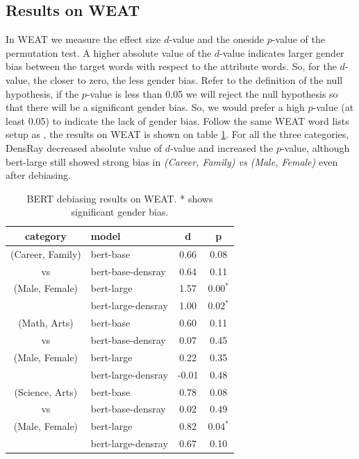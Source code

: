 \subsection{Results on WEAT}
In WEAT we measure the effect size $d$-value and the oneside $p$-value of the permutation test. A higher absolute value of the $d$-value indicates larger gender bias between the target words with respect to the attribute words. So, for the $d$-value, the closer to zero, the less gender bias. Refer to the definition of the null hypothesis, if the $p$-value is less than 0.05 we will reject the null hypothesis so that there will be a significant gender bias. So, we would prefer a high $p$-value (at least 0.05) to indicate the lack of gender bias. Follow the same WEAT word lists setup as \citet{karve2019conceptor}, the results on WEAT is shown on table \ref{t:weat1}. For all the three categories, DensRay decreased absolute value of $d$-value and increased the $p$-value, although bert-large still showed strong bias in \textit{(Career, Family) vs (Male, Female)} even after debiasing.
\begin{table}[ht]
\centering
\footnotesize
\begin{tabular}{clcc}
\hline
category & model & d & p\\
\hline
(Career, Family) & bert-base & 0.66 & 0.08 \\
vs& bert-base-densray & 0.64 & 0.11\\
(Male, Female)& bert-large & 1.57 & $0.00^{*}$ \\
& bert-large-densray & 1.00 & $0.02^{*}$\\
\hline
(Math, Arts) & bert-base & 0.60 & 0.11 \\
vs& bert-base-densray & 0.07 & 0.45\\
(Male, Female)& bert-large & 0.22 & 0.35 \\
& bert-large-densray & -0.01 & 0.48\\
\hline
(Science, Arts)& bert-base & 0.78 & 0.08 \\
vs& bert-base-densray & 0.02 & 0.49\\
(Male, Female) & bert-large & 0.82 & $0.04^{*}$  \\
& bert-large-densray & 0.67 & 0.10\\
\hline
\end{tabular}
\caption{\label{t:weat1}
BERT debiasing results on WEAT. * shows significant gender bias.}
\end{table}
